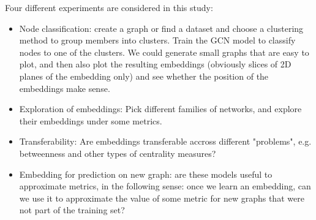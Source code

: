 \documentclass[a4paper]{article}
\begin{document}
Four different experiments are considered in this study:
\begin{itemize}

    \item Node classification: create a graph or find a dataset and choose a clustering method to group members into clusters. Train the GCN model to classify nodes to one of the clusters. We could generate small graphs that are easy to plot, and then also plot the resulting embeddings (obviously slices of 2D planes of the embedding only) and see whether the position of the embeddings make sense.
    
    \item Exploration of embeddings: Pick different families of networks, and explore their embeddings under some metrics.
    
    \item Transferability: Are embeddings transferable accross different "problems", e.g. betweenness and other types of centrality measures?
    
    \item Embedding for prediction on new graph: are these models useful to approximate metrics, in the following sense: once we learn an embedding, can we use it to approximate the value of some metric for new graphs that were not part of the training set?
    
  

\end{itemize}
\end{document}
